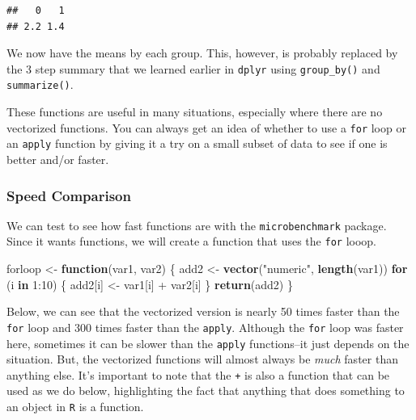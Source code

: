 \documentclass[]{tufte-book}
\newenvironment{Shaded}{}{}
\newcommand{\KeywordTok}[1]{\textcolor[rgb]{0.00,0.44,0.13}{\textbf{#1}}}
\newcommand{\DecValTok}[1]{\textcolor[rgb]{0.25,0.63,0.44}{#1}}
\newcommand{\StringTok}[1]{\textcolor[rgb]{0.25,0.44,0.63}{#1}}
\newcommand{\ControlFlowTok}[1]{\textcolor[rgb]{0.00,0.44,0.13}{\textbf{#1}}}
\newcommand{\OperatorTok}[1]{\textcolor[rgb]{0.40,0.40,0.40}{#1}}
\newcommand{\NormalTok}[1]{#1}
\theoremstyle{definition}
\theoremstyle{definition}
\theoremstyle{remark}
\begin{document}
\begin{verbatim}
##   0   1 
## 2.2 1.4
\end{verbatim}

We now have the means by each group. This, however, is probably replaced
by the 3 step summary that we learned earlier in \texttt{dplyr} using
\texttt{group\_by()} and \texttt{summarize()}.

These functions are useful in many situations, especially where there
are no vectorized functions. You can always get an idea of whether to
use a \texttt{for} loop or an \texttt{apply} function by giving it a try
on a small subset of data to see if one is better and/or faster.

\subsubsection*{Speed Comparison}\label{speed-comparison}

We can test to see how fast functions are with the
\texttt{microbenchmark} package. Since it wants functions, we will
create a function that uses the \texttt{for} looop.

\begin{Shaded}
\begin{Highlighting}[]
\NormalTok{forloop <-}\StringTok{ }\ControlFlowTok{function}\NormalTok{(var1, var2) \{}
\NormalTok{    add2 <-}\StringTok{ }\KeywordTok{vector}\NormalTok{(}\StringTok{"numeric"}\NormalTok{, }\KeywordTok{length}\NormalTok{(var1))}
    \ControlFlowTok{for}\NormalTok{ (i }\ControlFlowTok{in} \DecValTok{1}\OperatorTok{:}\DecValTok{10}\NormalTok{) \{}
\NormalTok{        add2[i] <-}\StringTok{ }\NormalTok{var1[i] }\OperatorTok{+}\StringTok{ }\NormalTok{var2[i]}
\NormalTok{    \}}
    \KeywordTok{return}\NormalTok{(add2)}
\NormalTok{\}}
\end{Highlighting}
\end{Shaded}

Below, we can see that the vectorized version is nearly 50 times faster
than the \texttt{for} loop and 300 times faster than the \texttt{apply}.
Although the \texttt{for} loop was faster here, sometimes it can be
slower than the \texttt{apply} functions--it just depends on the
situation. But, the vectorized functions will almost always be
\emph{much} faster than anything else. It's important to note that the
\texttt{+} is also a function that can be used as we do below,
highlighting the fact that anything that does something to an object in
\texttt{R} is a function.
\end{document}
